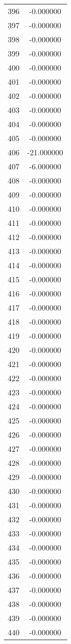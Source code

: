 \documentclass[12pt]{article}
\begin{document}
\begin{longtable}{@{}cc@{}}
396 & -0.000000 \\
397 & -0.000000 \\
398 & -0.000000 \\
399 & -0.000000 \\
400 & -0.000000 \\
401 & -0.000000 \\
402 & -0.000000 \\
403 & -0.000000 \\
404 & -0.000000 \\
405 & -0.000000 \\
406 & -21.000000 \\
407 & -6.000000 \\
408 & -0.000000 \\
409 & -0.000000 \\
410 & -0.000000 \\
411 & -0.000000 \\
412 & -0.000000 \\
413 & -0.000000 \\
414 & -0.000000 \\
415 & -0.000000 \\
416 & -0.000000 \\
417 & -0.000000 \\
418 & -0.000000 \\
419 & -0.000000 \\
420 & -0.000000 \\
421 & -0.000000 \\
422 & -0.000000 \\
423 & -0.000000 \\
424 & -0.000000 \\
425 & -0.000000 \\
426 & -0.000000 \\
427 & -0.000000 \\
428 & -0.000000 \\
429 & -0.000000 \\
430 & -0.000000 \\
431 & -0.000000 \\
432 & -0.000000 \\
433 & -0.000000 \\
434 & -0.000000 \\
435 & -0.000000 \\
436 & -0.000000 \\
437 & -0.000000 \\
438 & -0.000000 \\
439 & -0.000000 \\
440 & -0.000000 \\

\end{longtable}
\end{document}
